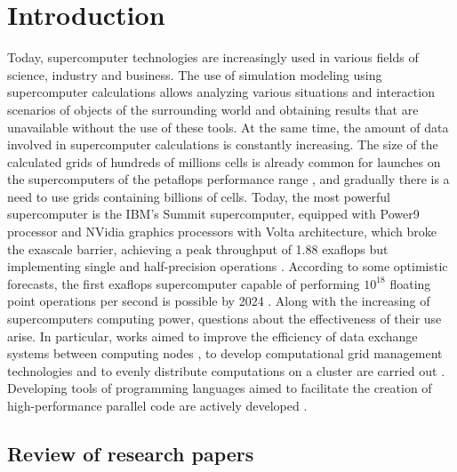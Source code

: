 \documentclass[
11pt,%
tightenlines,%
twoside,%
onecolumn,%
nofloats,%
nobibnotes,%
nofootinbib,%
superscriptaddress,%
noshowpacs,%
centertags]%
{revtex4}
\begin{document}
\maketitle


\section{Introduction}

Today, supercomputer technologies are increasingly used in various fields of science, industry and business. 
The use of simulation modeling using supercomputer calculations allows analyzing various situations and interaction scenarios of objects of the surrounding world and obtaining results that are unavailable without the use of these tools. 
At the same time, the amount of data involved in supercomputer calculations is constantly increasing. 
The size of the calculated grids of hundreds of millions cells is already common for launches on the supercomputers of the petaflops performance range \cite{Rettinger,Krappel}, and gradually there is a need to use grids containing billions of cells. 
Today, the most powerful supercomputer is the IBM's Summit supercomputer, equipped with Power9 processor and NVidia graphics processors with Volta architecture, which broke the exascale barrier, achieving a peak throughput of 1.88 exaflops but implementing single and half-precision operations \cite{Hines}.
According to some optimistic forecasts, the first exaflops supercomputer capable of performing $ 10^{18} $ floating point operations per second is possible by 2024 \cite{Markidis}.
Along with the increasing of supercomputers computing power, questions about the effectiveness of their use arise. 
In particular, works aimed to improve the efficiency of data exchange systems between computing nodes \cite{Klenk,Abduljabbar}, to develop computational grid management technologies and to evenly distribute computations on a cluster are carried out \cite{Rybakov,Van,Benderskiy}. 
Developing tools of programming languages aimed to facilitate the creation of high-performance parallel code are actively developed \cite{Heller,Roganov}.

\subsection{Review of research papers}
\end{document}
